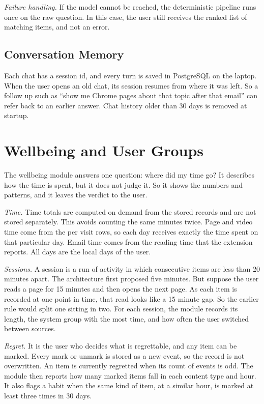 \documentclass[conference]{IEEEtran}
\begin{document}
\textit{Failure handling.} If the model cannot be reached, the deterministic pipeline runs once on the raw question. In this case, the user still receives the ranked list of matching items, and not an error.

\subsection{Conversation Memory}
Each chat has a session id, and every turn is saved in PostgreSQL on the laptop. When the user opens an old chat, its session resumes from where it was left. So a follow up such as ``show me Chrome pages about that topic after that email'' can refer back to an earlier answer. Chat history older than 30 days is removed at startup.

\section{Wellbeing and User Groups}\label{sec:wba}
The wellbeing module answers one question: where did my time go? It describes how the time is spent, but it does not judge it. So it shows the numbers and patterns, and it leaves the verdict to the user.

\textit{Time.} Time totals are computed on demand from the stored records and are not stored separately. This avoids counting the same minutes twice. Page and video time come from the per visit rows, so each day receives exactly the time spent on that particular day. Email time comes from the reading time that the extension reports. All days are the local days of the user.

\textit{Sessions.} A session is a run of activity in which consecutive items are less than 20 minutes apart. The architecture first proposed five minutes. But suppose the user reads a page for 15 minutes and then opens the next page. As each item is recorded at one point in time, that read looks like a 15 minute gap. So the earlier rule would split one sitting in two. For each session, the module records its length, the system group with the most time, and how often the user switched between sources.

\textit{Regret.} It is the user who decides what is regrettable, and any item can be marked. Every mark or unmark is stored as a new event, so the record is not overwritten. An item is currently regretted when its count of events is odd. The module then reports how many marked items fall in each content type and hour. It also flags a habit when the same kind of item, at a similar hour, is marked at least three times in 30 days.
\end{document}
